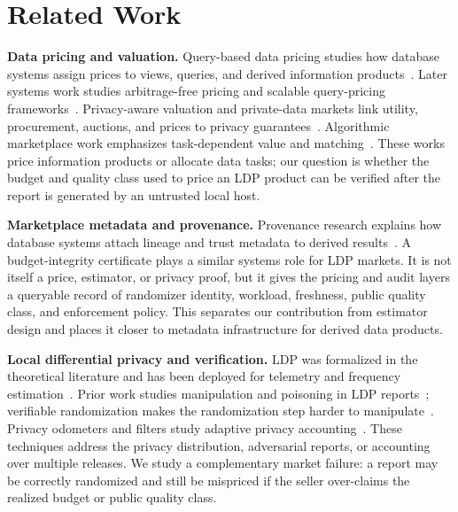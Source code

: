 \documentclass[conference]{IEEEtran}
\begin{document}
\section{Related Work}

\textbf{Data pricing and valuation.} Query-based data pricing studies how database systems assign prices to views, queries, and derived information products~\cite{koutris2012query,li2014pricing}. Later systems work studies arbitrage-free pricing and scalable query-pricing frameworks~\cite{deep2017design,qirana2017}. Privacy-aware valuation and private-data markets link utility, procurement, auctions, and prices to privacy guarantees~\cite{ghosh2011selling,chen2022privacy,chen2023privacy,lei2024privacy}. Algorithmic marketplace work emphasizes task-dependent value and matching~\cite{agarwal2019marketplace}. These works price information products or allocate data tasks; our question is whether the budget and quality class used to price an LDP product can be verified after the report is generated by an untrusted local host.

\textbf{Marketplace metadata and provenance.} Provenance research explains how database systems attach lineage and trust metadata to derived results~\cite{buneman2001provenance,green2007provenance}. A budget-integrity certificate plays a similar systems role for LDP markets. It is not itself a price, estimator, or privacy proof, but it gives the pricing and audit layers a queryable record of randomizer identity, workload, freshness, public quality class, and enforcement policy. This separates our contribution from estimator design and places it closer to metadata infrastructure for derived data products.

\textbf{Local differential privacy and verification.} LDP was formalized in the theoretical literature and has been deployed for telemetry and frequency estimation~\cite{duchi2013local,kasiviswanathan2011what,erlingsson2014rappor,Wang2017LDPFreq}. Prior work studies manipulation and poisoning in LDP reports~\cite{cheu2021manipulation,cao2021data,wu2021poisoning}; verifiable randomization makes the randomization step harder to manipulate~\cite{kato2021verifiable}. Privacy odometers and filters study adaptive privacy accounting~\cite{rogers2016odometers}. These techniques address the privacy distribution, adversarial reports, or accounting over multiple releases. We study a complementary market failure: a report may be correctly randomized and still be mispriced if the seller over-claims the realized budget or public quality class.
\end{document}

